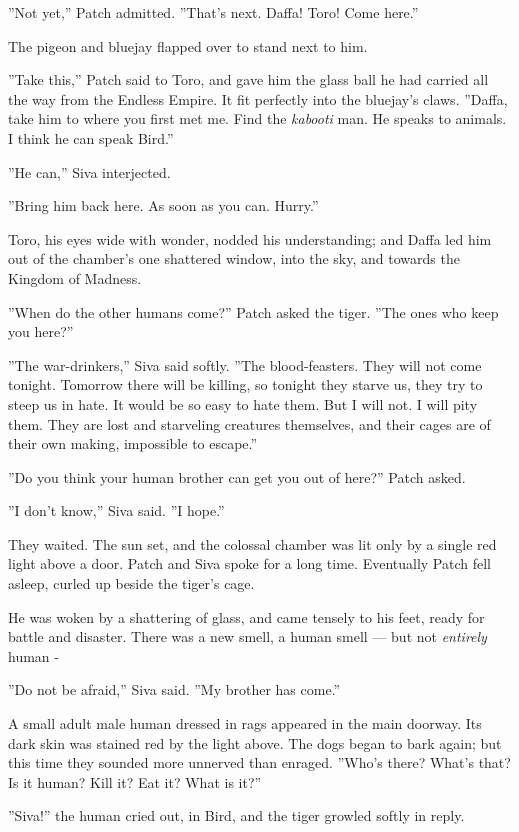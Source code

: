 \documentclass[12pt]{book}
\begin{document}
''Not yet,'' Patch admitted. ''That's next. Daffa! Toro! Come here.''

The pigeon and bluejay flapped over to stand next to him.

''Take this,'' Patch said to Toro, and gave him the glass ball he had
carried all the way from the Endless Empire. It fit perfectly into the
bluejay's claws. ''Daffa, take him to where you first met me. Find the
\textit{kabooti} man. He speaks to animals. I think he can speak
Bird.''

''He can,'' Siva interjected.

''Bring him back here. As soon as you can. Hurry.''

Toro, his eyes wide with wonder, nodded his understanding; and Daffa
led him out of the chamber's one shattered window, into the sky, and
towards the Kingdom of Madness.

''When do the other humans come?'' Patch asked the tiger. ''The ones
who keep you here?''

''The war-drinkers,'' Siva said softly. ''The blood-feasters. They
will not come tonight. Tomorrow there will be killing, so tonight they
starve us, they try to steep us in hate. It would be so easy to hate
them. But I will not. I will pity them. They are lost and starveling
creatures themselves, and their cages are of their own making,
impossible to escape.''

''Do you think your human brother can get you out of here?'' Patch
asked.

''I don't know,'' Siva said. ''I hope.''

They waited. The sun set, and the colossal chamber was lit only by a
single red light above a door. Patch and Siva spoke for a long
time. Eventually Patch fell asleep, curled up beside the tiger's cage.

He was woken by a shattering of glass, and came tensely to his feet,
ready for battle and disaster. There was a new smell, a human smell
--- but not \textit{entirely} human -

''Do not be afraid,'' Siva said. ''My brother has come.''

A small adult male human dressed in rags appeared in the main
doorway. Its dark skin was stained red by the light above. The dogs
began to bark again; but this time they sounded more unnerved than
enraged. ''Who's there? What's that? Is it human? Kill it? Eat it?
What is it?''

''Siva!'' the human cried out, in Bird, and the tiger growled softly
in reply.
\end{document}
